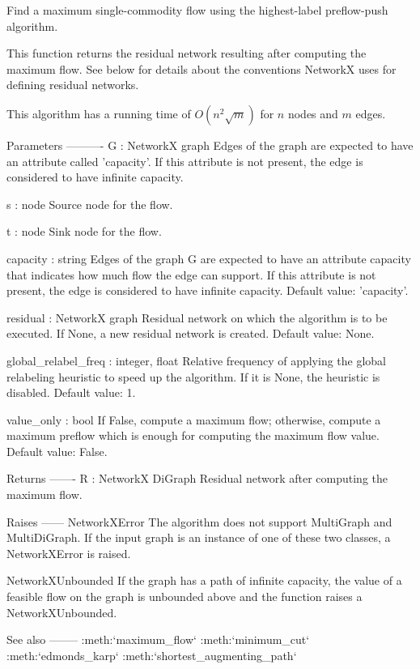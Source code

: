 \begin{DoxyVerb}Find a maximum single-commodity flow using the highest-label
preflow-push algorithm.

This function returns the residual network resulting after computing
the maximum flow. See below for details about the conventions
NetworkX uses for defining residual networks.

This algorithm has a running time of $O(n^2 \sqrt{m})$ for $n$ nodes and
$m$ edges.


Parameters
----------
G : NetworkX graph
    Edges of the graph are expected to have an attribute called
    'capacity'. If this attribute is not present, the edge is
    considered to have infinite capacity.

s : node
    Source node for the flow.

t : node
    Sink node for the flow.

capacity : string
    Edges of the graph G are expected to have an attribute capacity
    that indicates how much flow the edge can support. If this
    attribute is not present, the edge is considered to have
    infinite capacity. Default value: 'capacity'.

residual : NetworkX graph
    Residual network on which the algorithm is to be executed. If None, a
    new residual network is created. Default value: None.

global_relabel_freq : integer, float
    Relative frequency of applying the global relabeling heuristic to speed
    up the algorithm. If it is None, the heuristic is disabled. Default
    value: 1.

value_only : bool
    If False, compute a maximum flow; otherwise, compute a maximum preflow
    which is enough for computing the maximum flow value. Default value:
    False.

Returns
-------
R : NetworkX DiGraph
    Residual network after computing the maximum flow.

Raises
------
NetworkXError
    The algorithm does not support MultiGraph and MultiDiGraph. If
    the input graph is an instance of one of these two classes, a
    NetworkXError is raised.

NetworkXUnbounded
    If the graph has a path of infinite capacity, the value of a
    feasible flow on the graph is unbounded above and the function
    raises a NetworkXUnbounded.

See also
--------
:meth:`maximum_flow`
:meth:`minimum_cut`
:meth:`edmonds_karp`
:meth:`shortest_augmenting_path`


\end{DoxyVerb}
